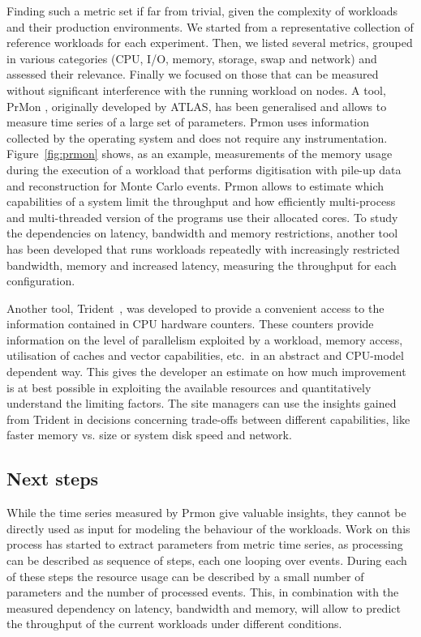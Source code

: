 Finding such a metric set if far from trivial, given the complexity of
workloads and their production environments. We started from a
representative collection of reference workloads for each experiment.
Then, we listed several metrics, grouped in various categories (CPU,
I/O, memory, storage, swap and network) and assessed their
relevance. Finally we focused on those that can be measured without
significant interference with the running workload on nodes. A tool,
PrMon \cite{prmon}, originally developed by ATLAS, has been
generalised and allows to measure time series of a large set of
parameters. Prmon uses information collected by the operating system
and does not require any instrumentation. Figure~\ref{fig:prmon}
shows, as an example, measurements of the memory usage during the
execution of a workload that performs digitisation with pile-up data
and reconstruction for Monte Carlo events.  Prmon allows to estimate
which capabilities of a system limit the throughput and how
efficiently multi-process and multi-threaded version of the programs
use their allocated cores. To study the dependencies on latency,
bandwidth and memory restrictions, another tool has been developed
that runs workloads repeatedly with increasingly restricted bandwidth,
memory and increased latency, measuring the throughput for each
configuration.

Another tool, Trident~\cite{trident}, was developed to provide a
convenient access to the information contained in CPU hardware
counters.  These counters provide information on the level of
parallelism exploited by a workload, memory access, utilisation of
caches and vector capabilities, etc.~in an abstract and CPU-model
dependent way.  This gives the developer an estimate on how much
improvement is at best possible in exploiting the available resources
and quantitatively understand the limiting factors. The site managers
can use the insights gained from Trident in decisions concerning
trade-offs between different capabilities, like faster memory vs. size
or system disk speed and network.

\subsection{Next steps}
While the time series measured by Prmon give valuable insights, they
cannot be directly used as input for modeling the behaviour of the
workloads. Work on this process has started to extract parameters from
metric time series, as processing can be described as sequence of
steps, each one looping over events. During each of these steps the
resource usage can be described by a small number of parameters and
the number of processed events. This, in combination with the measured
dependency on latency, bandwidth and memory, will allow to predict the
throughput of the current workloads under different conditions.


